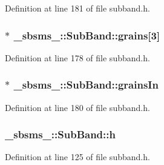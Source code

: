 Definition at line 181 of file subband.\+h.

\subsubsection[{\texorpdfstring{grains}{grains}}]{$\ast$ \+\_\+sbsms\+\_\+\+::\+Sub\+Band\+::grains\mbox{[}3\mbox{]}\hspace{0.3cm}{\ttfamily [protected]}}\hypertarget{class__sbsms___1_1_sub_band_a546b82216d3274993456e5089d8f74ec}{}\label{class__sbsms___1_1_sub_band_a546b82216d3274993456e5089d8f74ec}


Definition at line 178 of file subband.\+h.

\subsubsection[{\texorpdfstring{grains\+In}{grainsIn}}]{$\ast$ \+\_\+sbsms\+\_\+\+::\+Sub\+Band\+::grains\+In\hspace{0.3cm}{\ttfamily [protected]}}\hypertarget{class__sbsms___1_1_sub_band_a3967afa5622ee079193e29e430d1d901}{}\label{class__sbsms___1_1_sub_band_a3967afa5622ee079193e29e430d1d901}


Definition at line 180 of file subband.\+h.

\subsubsection[{\texorpdfstring{h}{h}}]{ \+\_\+sbsms\+\_\+\+::\+Sub\+Band\+::h\hspace{0.3cm}{\ttfamily [protected]}}\hypertarget{class__sbsms___1_1_sub_band_a169a48f21a5f3f3a1d33601b1e8a8806}{}\label{class__sbsms___1_1_sub_band_a169a48f21a5f3f3a1d33601b1e8a8806}


Definition at line 125 of file subband.\+h.

